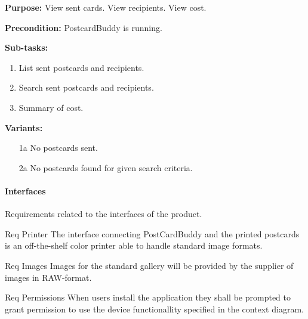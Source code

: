 \documentclass[10pt,a4paper]{article}
\begin{document}
\begin {description}
\begin {description}
\item \textbf{Purpose:} View sent cards. View recipients. View cost.
\item \textbf{Precondition:} PostcardBuddy is running. 

\item \textbf{Sub-tasks:}
\begin{enumerate}
\item List sent postcards and recipients. 
\item Search sent postcards and recipients.
\item Summary of cost.  

\end{enumerate}
\item \textbf{Variants:}
\begin{itemize}[label={}]

\item[1a] No postcards sent. 
\item[2a] No postcards found for given search criteria. 

\end{itemize}
\end{description}
\end{description}



\paragraph{Interfaces}
Requirements related to the interfaces of the product.

\begin {description}
	\item [Req \thesubsubsection {.\theinterf} Printer] The interface connecting PostCardBuddy and the printed postcards is an off-the-shelf color printer able to handle standard image formats.

	\item [Req \thesubsubsection {.\theinterf} Images] Images for the standard gallery will be provided by the supplier of images in RAW-format.

	\item [Req \thesubsubsection {.\theinterf} Permissions] When users install the application they shall be prompted to grant permission to use the device functionallity specified in the context diagram.  
\end{description}
\end{document}
